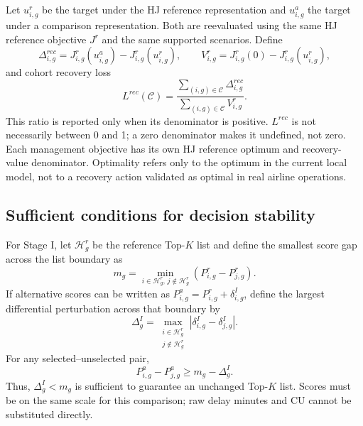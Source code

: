 \documentclass[10pt,a4paper]{article}
\numberwithin{equation}{section}
\begin{document}
Let $u^r_{i,g}$ be the target under the HJ reference representation and $u^a_{i,g}$ the target under a comparison representation. Both are reevaluated using the same HJ reference objective $J^r$ and the same supported scenarios. Define
\begin{equation}
\Delta^{rec}_{i,g}=J^r_{i,g}(u^a_{i,g})-J^r_{i,g}(u^r_{i,g}),\qquad
V^r_{i,g}=J^r_{i,g}(0)-J^r_{i,g}(u^r_{i,g}),
\label{eq:recovery-components}
\end{equation}
and cohort recovery loss
\begin{equation}
L^{rec}(\mathcal C)=\frac{\sum_{(i,g)\in\mathcal C}\Delta^{rec}_{i,g}}{\sum_{(i,g)\in\mathcal C}V^r_{i,g}}.
\label{eq:lrec}
\end{equation}
This ratio is reported only when its denominator is positive. $L^{rec}$ is not necessarily between 0 and 1; a zero denominator makes it undefined, not zero. Each management objective has its own HJ reference optimum and recovery-value denominator. Optimality refers only to the optimum in the current local model, not to a recovery action validated as optimal in real airline operations.

\subsection{Sufficient conditions for decision stability}
For Stage I, let $\mathcal H^r_g$ be the reference Top-$K$ list and define the smallest score gap across the list boundary as
\begin{equation}
m_g=\min_{i\in\mathcal H^r_g,\,j\notin\mathcal H^r_g}(P^r_{i,g}-P^r_{j,g}).
\end{equation}
If alternative scores can be written as $P^a_{i,g}=P^r_{i,g}+\delta^I_{i,g}$, define the largest differential perturbation across that boundary by
\begin{equation}
\Delta^I_g=\max_{\substack{i\in\mathcal H^r_g\\j\notin\mathcal H^r_g}}|\delta^I_{i,g}-\delta^I_{j,g}|.
\end{equation}
For any selected--unselected pair,
\begin{equation}
P^a_{i,g}-P^a_{j,g}\geq m_g-\Delta^I_g.
\end{equation}
Thus, $\Delta^I_g<m_g$ is sufficient to guarantee an unchanged Top-$K$ list. Scores must be on the same scale for this comparison; raw delay minutes and CU cannot be substituted directly.
\end{document}
